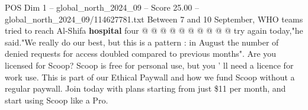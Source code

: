 \begin{textsample}{POS Dim 1 – global\_north\_2024\_09 – Score 25.00 – global\_north\_2024\_09/114627781.txt}
Between 7 and 10 September, WHO teams tried to reach Al-Shifa \textbf{hospital} four @ @ @ @ @ @ @ @ @ @ try again today,"he said."We really do our best, but this is a pattern : in August the number of denied requests for access doubled compared to previous months".
Are you licensed for Scoop?
Scoop is free for personal use, but you ' ll need a licence for work use.
This is part of our Ethical Paywall and how we fund Scoop without a regular paywall.
Join today with plans starting from just \$11 per month, and start using Scoop like a Pro.

\end{textsample}
